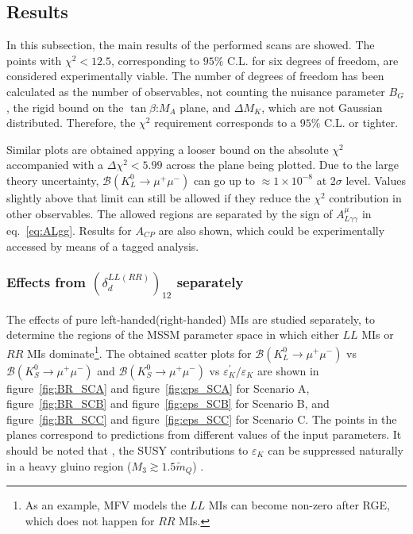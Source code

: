 \subsection{Results}
\label{subsec:results}
In this subsection, the main results of the performed scans are showed. The points with $\chi^2<12.5$, corresponding to $95\%$ C.L. for six degrees of freedom, are considered experimentally viable. The number of degrees of freedom has been calculated as the number
of observables, not counting the nuisance parameter $B_G$, the rigid bound on the $\tan\beta$:$M_A$ plane, and $\Delta M_K$, which
are not Gaussian distributed. Therefore, the $\chi^2$ requirement corresponds to a $95\%$ C.L. or tighter. 

Similar plots are obtained appying a looser bound on the absolute $\chi^2$ accompanied with a $\Delta\chi^2 <5.99$ across the plane being plotted. Due to the large theory uncertainty, $\mathcal{B}(K_L^0\rightarrow\mu^+\mu^-)$ can go up to $\approx 1\times 10^{-8}$ at 2$\sigma$ level. Values slightly above that limit can still be allowed if they reduce the $\chi^2$ contribution in other observables. The allowed regions are separated by the sign of $A^\mu_{L\gamma\gamma}$ in eq.~\eqref{eq:ALgg}. Results for $A_{CP}$ are also shown, which could be experimentally accessed by means of a tagged analysis.

\subsubsection{Effects from $\left(  \delta_{d}^{LL(RR)} \right)_{12}$ separately}
The effects of pure left-handed(right-handed) MIs are studied separately, to determine the regions of the MSSM parameter space in which either $LL$ MIs or $RR$ MIs dominate\footnote{As an example, MFV models the $LL$ MIs can become non-zero after RGE,
which does not happen for $RR$ MIs.}.
The obtained scatter plots for $\mathcal{B}(K_L^0\rightarrow\mu^+\mu^-)$  vs $\mathcal{B}(K_S^0\rightarrow\mu^+\mu^-)$ and $\mathcal{B}(K_S^0\rightarrow\mu^+\mu^-)$ vs $\varepsilon^\prime_K /\varepsilon_K$ are shown in figure~\ref{fig:BR_SCA} and figure~\ref{fig:eps_SCA} for Scenario A, figure~\ref{fig:BR_SCB} and figure~\ref{fig:eps_SCB} for Scenario B, and figure~\ref{fig:BR_SCC} and figure~\ref{fig:eps_SCC} for Scenario C. The points in the planes correspond to predictions from different
values of the input parameters. It should be noted that , the SUSY contributions to $\varepsilon_K$ can be suppressed naturally in a heavy gluino region ($M_3  \gtrsim 1.5 \tilde{m}_{Q}$) \cite{Crivellin:2010ys,Kitahara:2016otd}.

